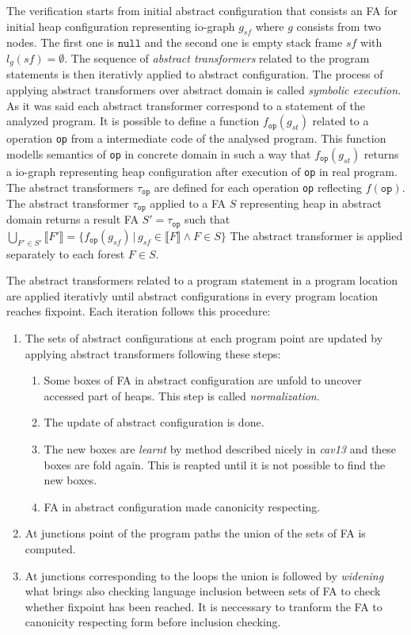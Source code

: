 The verification starts from initial abstract configuration that consists an FA for initial heap configuration representing io-graph
$g_{sf}$ where $g$ consists from two nodes.
The first one is $\texttt{null}$ and the second one is empty stack frame $sf$ with $l_g(sf) = \emptyset$.
The sequence of \emph{abstract transformers} related to the program statements is then iterativly applied to abstract configuration.
The process of applying abstract transformers over abstract domain is called \emph{symbolic execution}.
As it was said each abstract transformer correspond to a statement of the analyzed program.
It is possible to define a function $f_{\texttt{op}}(g_{st})$ related to a operation \texttt{op} from a intermediate code of the analysed program.
This function modells semantics of \texttt{op} in concrete domain in such a way that $f_{\texttt{op}}(g_{st})$
returns a io-graph representing heap configuration after execution of \texttt{op} in real program.
The abstract transformers $\tau_{\texttt{op}}$ are defined for each operation \texttt{op} reflecting $f(\texttt{op})$.
The abstract transformer $\tau_{\texttt{op}}$ applied to a FA $S$ representing heap in abstract domain returns a result FA $S' = \tau_{\texttt{op}}$
such that $\bigcup_{F' \in S'} \llbracket F' \rrbracket = \{ f_{\texttt{op}}(g_{sf}) \,|\, g_{sf} \in \llbracket F \rrbracket \wedge F \in S \}$
The abstract transformer is applied separately to each forest $F \in S$.

The abstract transformers related to a program statement in a program location are applied iterativly until
abstract configurations in every program location reaches fixpoint.
Each iteration follows this procedure:
\begin{enumerate}
		\item The sets of abstract configurations at each program point are updated by applying abstract transformers following
			these steps:
			\begin{enumerate}
				\item Some boxes of FA in abstract configuration are unfold to uncover accessed part of heaps.
					This step is called \emph{normalization}.
				\item The update of abstract configuration is done.
				\item The new boxes are \emph{learnt} by method described nicely in \emph{cav13}
					and these boxes are fold again.
					This is reapted until it is not possible to find the new boxes.
				\item FA in abstract configuration made canonicity respecting.
			\end{enumerate}
		\item At junctions point of the program paths the union of the sets of FA is computed.
		\item At junctions corresponding to the loops the union is followed by \emph{widening}
			what brings also checking language inclusion between sets of FA to check whether fixpoint has been reached.
			It is neccessary to tranform the FA to canonicity respecting form before inclusion checking.
\end{enumerate}

